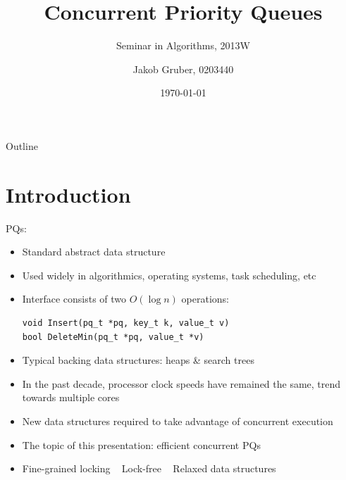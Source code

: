 \documentclass[usenames,dvipsnames]{beamer}
\title{Concurrent Priority Queues}
\subtitle{Seminar in Algorithms, 2013W}
\author{Jakob Gruber, 0203440}
\date{\today}
\begin{document}
\maketitle

\begin{frame}{Outline}
\begin{minipage}[t][10em][t]{\linewidth}
\tableofcontents
\end{minipage}
\end{frame}

\section{Introduction} \label{sec:intro}

\begin{frame}{}
\acp{PQ}:

\begin{itemize}
\item Standard abstract data structure
\item Used widely in algorithmics, operating systems, task scheduling, etc
\item Interface consists of two $O(\log n)$ operations:

\begin{lstlisting}
void Insert(pq_t *pq, key_t k, value_t v)
bool DeleteMin(pq_t *pq, value_t *v)
\end{lstlisting}

\item Typical backing data structures: heaps \& search trees
\end{itemize}

\framebreak

\begin{itemize}
\item In the past decade, processor clock speeds have remained the same, trend towards multiple cores
\item New data structures required to take advantage of concurrent execution
\item The topic of this presentation: efficient concurrent \acp{PQ}
\item Fine-grained locking \textrightarrow ~ Lock-free \textrightarrow ~ Relaxed data structures
\end{itemize}

\end{frame}
\end{document}

